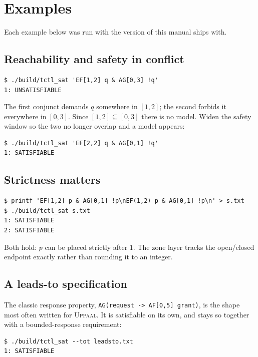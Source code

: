 \section{Examples}

Each example below was run with the version of \tool this manual ships with.

\subsection{Reachability and safety in conflict}

\begin{lstlisting}
$ ./build/tctl_sat 'EF[1,2] q & AG[0,3] !q'
1: UNSATISFIABLE
\end{lstlisting}

\noindent
The first conjunct demands $q$ somewhere in $[1,2]$; the second forbids it
everywhere in $[0,3]$.  Since $[1,2]\subseteq[0,3]$ there is no model.  Widen
the safety window so the two no longer overlap and a model appears:

\begin{lstlisting}
$ ./build/tctl_sat 'EF[2,2] q & AG[0,1] !q'
1: SATISFIABLE
\end{lstlisting}

\subsection{Strictness matters}

\begin{lstlisting}
$ printf 'EF[1,2] p & AG[0,1] !p\nEF(1,2) p & AG[0,1] !p\n' > s.txt
$ ./build/tctl_sat s.txt
1: SATISFIABLE
2: SATISFIABLE
\end{lstlisting}

\noindent
Both hold: $p$ can be placed strictly after $1$.  The zone layer tracks the
open/closed endpoint exactly rather than rounding it to an integer.

\subsection{A leads-to specification}

The classic response property, \texttt{AG(request -> AF[0,5] grant)}, is the
shape most often written for \textsc{Uppaal}.  It is satisfiable on its own, and
stays so together with a bounded-response requirement:

\begin{lstlisting}
$ ./build/tctl_sat --tot leadsto.txt
1: SATISFIABLE
\end{lstlisting}

